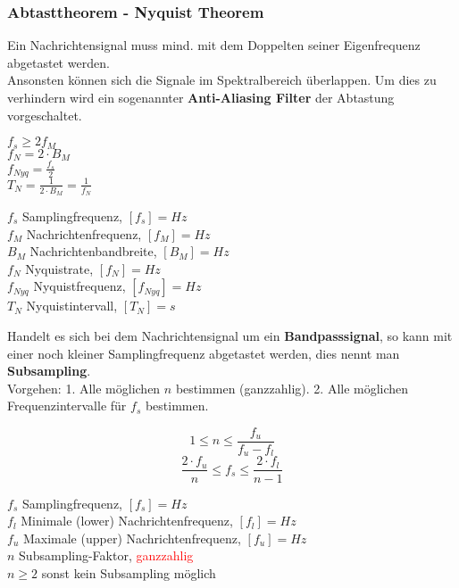 \subsubsection{Abtasttheorem - Nyquist Theorem}
Ein Nachrichtensignal muss mind. mit dem Doppelten seiner Eigenfrequenz abgetastet werden. \\
Ansonsten können sich die Signale im Spektralbereich überlappen.  Um dies zu verhindern wird ein
sogenannter \textbf{Anti-Aliasing Filter} der Abtastung vorgeschaltet.\\
\begin{minipage}[t][2.7cm][c]{8cm}
$ f_s \geq 2 f_M $ \\
$ f_N = 2 \cdot B_M $ \\
$ f_{Nyq} = \frac{f_s}{2}$ \\
$ T_N = \frac{1}{2\cdot B_M} = \frac{1}{f_N} $

\end{minipage}
\begin{minipage}[t][2.7cm][c]{10cm}
	$f_s$ Samplingfrequenz, $[f_s] = Hz$ \\
	$f_M$ Nachrichtenfrequenz, $[f_M] = Hz$ \\
	$B_M$ Nachrichtenbandbreite, $[B_M] = Hz$ \\
	$f_N$ Nyquistrate, $[f_N] = Hz$ \\
	$f_{Nyq}$ Nyquistfrequenz, $[f_{Nyq}] = Hz$ \\
	$T_N$ Nyquistintervall, $[T_N] = s$ \\	
\end{minipage}

Handelt es sich bei dem Nachrichtensignal um ein \textbf{Bandpasssignal}, so kann mit einer noch
kleiner Samplingfrequenz abgetastet werden, dies nennt man \textbf{Subsampling}. \\
Vorgehen: 1. Alle möglichen $n$ bestimmen (ganzzahlig). 2. Alle möglichen Frequenzintervalle für
$f_s$ bestimmen.

\begin{minipage}[t][2cm][c]{10cm}
$$ 1 \leq n \leq \frac{f_u}{f_u - f_l} $$
$$ \frac{2 \cdot f_u}{n} \leq f_s \leq \frac{2 \cdot f_l}{n-1}$$
\end{minipage}
\begin{minipage}[t][2cm][c]{8cm}
	$f_s$ Samplingfrequenz, $[f_s] = Hz$ \\
	$f_l$ Minimale (lower) Nachrichtenfrequenz, $[f_l] = Hz$ \\
	$f_u$ Maximale (upper) Nachrichtenfrequenz, $[f_u] = Hz$ \\
	$n$ Subsampling-Faktor, \textcolor{red}{ganzzahlig} \\
	$n \geq 2$ sonst kein Subsampling möglich
\end{minipage}

